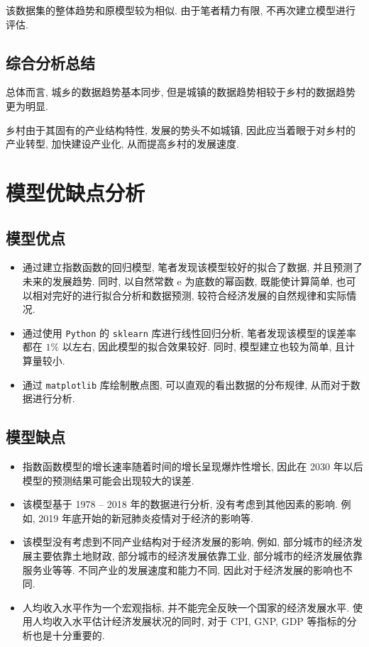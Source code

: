 \documentclass{article}
\begin{document}
该数据集的整体趋势和原模型较为相似. 由于笔者精力有限, 不再次建立模型进行评估.

\subsection{综合分析总结}

\par 总体而言, 城乡的数据趋势基本同步, 但是城镇的数据趋势相较于乡村的数据趋势更为明显.

\par 乡村由于其固有的产业结构特性, 发展的势头不如城镇, 因此应当着眼于对乡村的产业转型, 加快建设产业化, 从而提高乡村的发展速度.

\section{模型优缺点分析}\label{sec:advantage}

\subsection{模型优点}

\begin{itemize}
  \item 通过建立指数函数的回归模型, 笔者发现该模型较好的拟合了数据, 并且预测了未来的发展趋势. 同时, 以自然常数 $\mathrm e$ 为底数的幂函数, 既能使计算简单, 也可以相对完好的进行拟合分析和数据预测, 较符合经济发展的自然规律和实际情况.
  \item 通过使用 \texttt{Python} 的 \texttt{sklearn} 库进行线性回归分析, 笔者发现该模型的误差率都在 $1\%$ 以左右, 因此模型的拟合效果较好. 同时, 模型建立也较为简单, 且计算量较小.
  \item 通过 \texttt{matplotlib} 库绘制散点图, 可以直观的看出数据的分布规律, 从而对于数据进行分析.
\end{itemize}

\subsection{模型缺点}

\begin{itemize}
  \item 指数函数模型的增长速率随着时间的增长呈现爆炸性增长, 因此在 2030 年以后模型的预测结果可能会出现较大的误差.
  \item 该模型基于 1978 -- 2018 年的数据进行分析, 没有考虑到其他因素的影响. 例如, 2019 年底开始的新冠肺炎疫情对于经济的影响等.
  \item 该模型没有考虑到不同产业结构对于经济发展的影响, 例如, 部分城市的经济发展主要依靠土地财政, 部分城市的经济发展依靠工业, 部分城市的经济发展依靠服务业等等. 不同产业的发展速度和能力不同, 因此对于经济发展的影响也不同.
  \item 人均收入水平作为一个宏观指标, 并不能完全反映一个国家的经济发展水平. 使用人均收入水平估计经济发展状况的同时, 对于 CPI, GNP, GDP 等指标的分析也是十分重要的.
\end{itemize}
\end{document}
